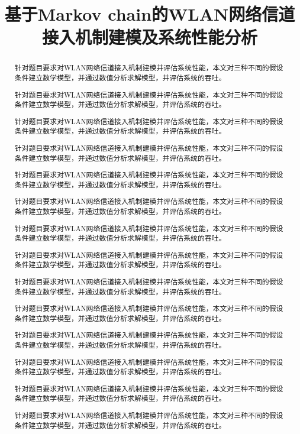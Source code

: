 \documentclass[bwprint]{gmcmthesis}
\title{基于Markov chain的WLAN网络信道接入机制建模及系统性能分析}
\begin{document}
 
 \maketitle
 
\begin{abstract}
针对题目要求对WLAN网络信道接入机制建模并评估系统性能，本文对三种不同的假设条件建立数学模型，并通过数值分析求解模型，并评估系统的吞吐。

针对题目要求对WLAN网络信道接入机制建模并评估系统性能，本文对三种不同的假设条件建立数学模型，并通过数值分析求解模型，并评估系统的吞吐。

针对题目要求对WLAN网络信道接入机制建模并评估系统性能，本文对三种不同的假设条件建立数学模型，并通过数值分析求解模型，并评估系统的吞吐。


针对题目要求对WLAN网络信道接入机制建模并评估系统性能，本文对三种不同的假设条件建立数学模型，并通过数值分析求解模型，并评估系统的吞吐。

针对题目要求对WLAN网络信道接入机制建模并评估系统性能，本文对三种不同的假设条件建立数学模型，并通过数值分析求解模型，并评估系统的吞吐。

针对题目要求对WLAN网络信道接入机制建模并评估系统性能，本文对三种不同的假设条件建立数学模型，并通过数值分析求解模型，并评估系统的吞吐。

针对题目要求对WLAN网络信道接入机制建模并评估系统性能，本文对三种不同的假设条件建立数学模型，并通过数值分析求解模型，并评估系统的吞吐。


针对题目要求对WLAN网络信道接入机制建模并评估系统性能，本文对三种不同的假设条件建立数学模型，并通过数值分析求解模型，并评估系统的吞吐。

针对题目要求对WLAN网络信道接入机制建模并评估系统性能，本文对三种不同的假设条件建立数学模型，并通过数值分析求解模型，并评估系统的吞吐。

针对题目要求对WLAN网络信道接入机制建模并评估系统性能，本文对三种不同的假设条件建立数学模型，并通过数值分析求解模型，并评估系统的吞吐。

针对题目要求对WLAN网络信道接入机制建模并评估系统性能，本文对三种不同的假设条件建立数学模型，并通过数值分析求解模型，并评估系统的吞吐。


针对题目要求对WLAN网络信道接入机制建模并评估系统性能，本文对三种不同的假设条件建立数学模型，并通过数值分析求解模型，并评估系统的吞吐。

针对题目要求对WLAN网络信道接入机制建模并评估系统性能，本文对三种不同的假设条件建立数学模型，并通过数值分析求解模型，并评估系统的吞吐。

针对题目要求对WLAN网络信道接入机制建模并评估系统性能，本文对三种不同的假设条件建立数学模型，并通过数值分析求解模型，并评估系统的吞吐。

\end{abstract}
\end{document}
